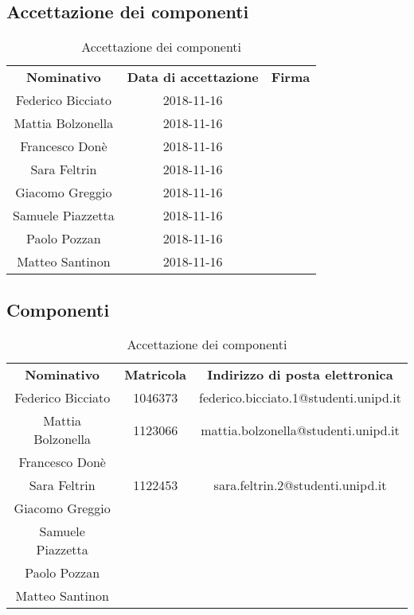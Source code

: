 \subsection{Accettazione dei componenti}
\begin{table}[H]
	\centering\renewcommand{\arraystretch}{1.5}
	\begin{tabular}{c|c|c}
		\hline
		
		\rowcolorhead 
		{ \textbf{Nominativo}} &
		{ \textbf{Data di accettazione}} &
		{ \textbf{Firma}}  \\
		
		\rowcolorlight
		Federico Bicciato & 2018-11-16 &   \\ \hline
		\rowcolordark
		Mattia Bolzonella & 2018-11-16 &   \\ \hline
		\rowcolorlight
		Francesco Donè & 2018-11-16 &   \\ \hline
		\rowcolordark
		Sara Feltrin & 2018-11-16 &   \\ \hline
		\rowcolorlight
		Giacomo Greggio & 2018-11-16 &   \\ \hline
		\rowcolordark
		Samuele Piazzetta & 2018-11-16 &   \\ \hline
		\rowcolorlight
		Paolo Pozzan & 2018-11-16 &   \\ \hline
		\rowcolordark
		Matteo Santinon & 2018-11-16 &   \\ \hline
	\end{tabular}
	\caption{Accettazione dei componenti}
\end{table}

\subsection{Componenti}
\begin{table}[H]
	\centering\renewcommand{\arraystretch}{1.5}
	\begin{tabular}{c|c|c}
		\hline
		
		\rowcolorhead 
		{ \textbf{Nominativo}} &
		{ \textbf{Matricola}} &
		{ \textbf{Indirizzo di posta elettronica}}  \\
		
		\rowcolorlight
		Federico Bicciato & 1046373 & federico.bicciato.1@studenti.unipd.it  \\ \hline
		\rowcolordark
		Mattia Bolzonella & 1123066 & mattia.bolzonella@studenti.unipd.it  \\ \hline
		\rowcolorlight
		Francesco Donè &  &   \\ \hline
		\rowcolordark
		Sara Feltrin & 1122453 &  sara.feltrin.2@studenti.unipd.it \\ \hline
		\rowcolorlight
		Giacomo Greggio &  &   \\ \hline
		\rowcolordark
		Samuele Piazzetta &  &   \\ \hline
		\rowcolorlight
		Paolo Pozzan &  &   \\ \hline
		\rowcolordark
		Matteo Santinon &  &   \\ \hline
	\end{tabular}
	\caption{Accettazione dei componenti}
\end{table}

